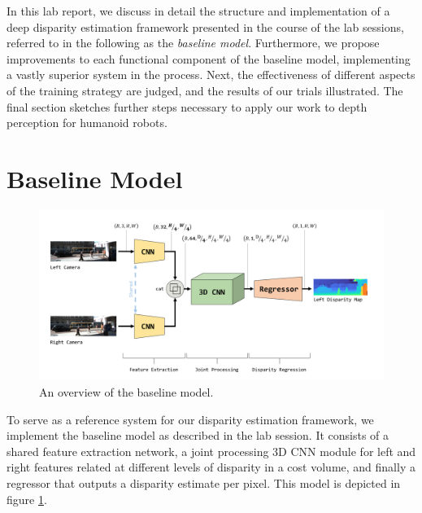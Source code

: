 \documentclass[runningheads]{llncs}
\begin{document}
In this lab report, we discuss in detail the structure and implementation of a deep disparity estimation framework presented in the course of the lab sessions, referred to in the following as the \textit{baseline model}. Furthermore, we propose improvements to each functional component of the baseline model, implementing a vastly superior system in the process. Next, the effectiveness of different aspects of the training strategy are judged, and the results of our trials illustrated. The final section sketches further steps necessary to apply our work to depth perception for humanoid robots.

\section{Baseline Model}
\begin{figure}[h]
\vspace{-1px}
  \centering
    \includegraphics[width=0.99\linewidth]{images/Baseline Model Pipeline.png}
    \caption{An overview of the baseline model.}
    \label{Fig:Baseline_Model_Overview}
\end{figure}
To serve as a reference system for our disparity estimation framework, we implement the baseline model as described in the lab session. It consists of a shared feature extraction network, a joint processing 3D CNN module for left and right features related at different levels of disparity in a cost volume, and finally a regressor that outputs a disparity estimate per pixel. This model is depicted in figure \ref{Fig:Baseline_Model_Overview}.
\end{document}
